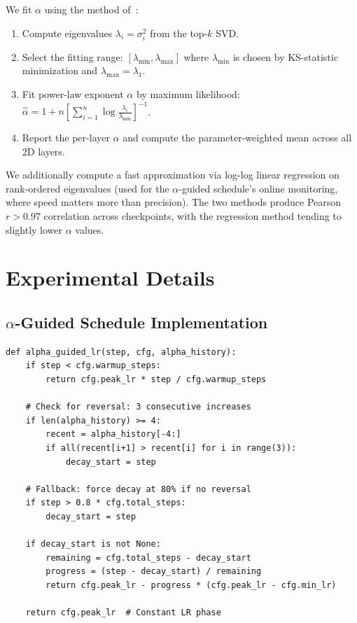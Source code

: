 We fit $\alpha$ using the method of~\citet{martin_mahoney_jmlr2021}:

\begin{enumerate}[leftmargin=*,itemsep=1pt]
    \item Compute eigenvalues $\lambda_i = \sigma_i^2$ from the top-$k$ SVD.
    \item Select the fitting range: $[\lambda_{\min}, \lambda_{\max}]$ where $\lambda_{\min}$ is chosen by KS-statistic minimization and $\lambda_{\max} = \lambda_1$.
    \item Fit power-law exponent $\alpha$ by maximum likelihood: $\hat\alpha = 1 + n \left[\sum_{i=1}^n \log\frac{\lambda_i}{\lambda_{\min}}\right]^{-1}$.
    \item Report the per-layer $\alpha$ and compute the parameter-weighted mean across all 2D layers.
\end{enumerate}

We additionally compute a fast approximation via log-log linear regression on rank-ordered eigenvalues (used for the $\alpha$-guided schedule's online monitoring, where speed matters more than precision). The two methods produce Pearson $r > 0.97$ correlation across checkpoints, with the regression method tending to slightly lower $\alpha$ values.

\section{Experimental Details}
\label{app:exp_details}

\subsection{$\alpha$-Guided Schedule Implementation}

\begin{verbatim}
def alpha_guided_lr(step, cfg, alpha_history):
    if step < cfg.warmup_steps:
        return cfg.peak_lr * step / cfg.warmup_steps

    # Check for reversal: 3 consecutive increases
    if len(alpha_history) >= 4:
        recent = alpha_history[-4:]
        if all(recent[i+1] > recent[i] for i in range(3)):
            decay_start = step

    # Fallback: force decay at 80% if no reversal
    if step > 0.8 * cfg.total_steps:
        decay_start = step

    if decay_start is not None:
        remaining = cfg.total_steps - decay_start
        progress = (step - decay_start) / remaining
        return cfg.peak_lr - progress * (cfg.peak_lr - cfg.min_lr)

    return cfg.peak_lr  # Constant LR phase
\end{verbatim}

